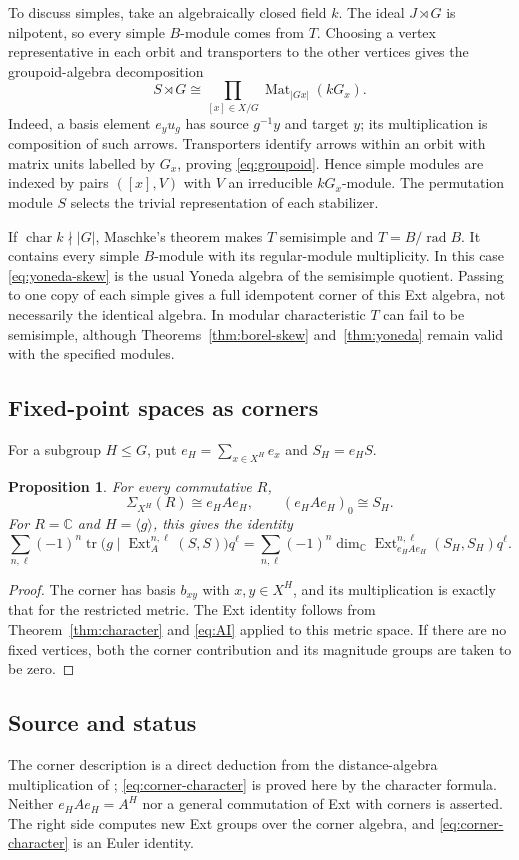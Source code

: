 \documentclass[11pt,a4paper]{article}
\numberwithin{equation}{section}
\newtheorem{proposition}[theorem]{Proposition}
\theoremstyle{definition}
\theoremstyle{remark}
\newcommand{\C}{\mathbb C}
\newcommand{\G}{G}
\newcommand{\Ext}{\operatorname{Ext}}
\newcommand{\tr}{\operatorname{tr}}
\newcommand{\rad}{\operatorname{rad}}
\newcommand{\source}{\subsection*{\color{darkblue}Source and status}}
\begin{document}
To discuss simples, take an algebraically closed field $k$.
The ideal $J\rtimes\G$ is nilpotent, so every simple $B$-module
comes from $T$.  Choosing a vertex representative in each orbit and
transporters to the other vertices gives the groupoid-algebra
decomposition
\begin{equation}\label{eq:groupoid}
 S\rtimes\G\cong
 \prod_{[x]\in X/\G}\operatorname{Mat}_{|\G x|}(k\G_x).
\end{equation}
Indeed, a basis element $e_yu_g$ has source $g^{-1}y$ and target $y$;
its multiplication is composition of such arrows.  Transporters
identify arrows within an orbit with matrix units labelled by
$\G_x$, proving \eqref{eq:groupoid}.  Hence simple modules are indexed
by pairs $([x],V)$ with $V$ an irreducible $k\G_x$-module.  The
permutation module $S$ selects the trivial representation of each
stabilizer.

If $\operatorname{char}k\nmid|\G|$, Maschke's theorem makes $T$
semisimple and $T=B/\rad B$.  It contains every simple $B$-module
with its regular-module multiplicity.  In this case
\eqref{eq:yoneda-skew} is the usual Yoneda algebra of the semisimple
quotient.  Passing to one copy of each simple gives a full idempotent
corner of this Ext algebra, not necessarily the identical algebra.
In modular characteristic $T$ can fail to be semisimple, although
Theorems~\ref{thm:borel-skew} and~\ref{thm:yoneda} remain valid with
the specified modules.

\subsection{Fixed-point spaces as corners}

For a subgroup $H\leq\G$, put
$e_H=\sum_{x\in X^H}e_x$ and $S_H=e_HS$.
\begin{proposition}\label{prop:fixed-corner}
For every commutative $R$,
\[
 \Sigma_{X^H}(R)\cong e_HAe_H,
 \qquad (e_HAe_H)_0\cong S_H.
\]
For $R=\C$ and $H=\langle g\rangle$, this gives the identity
\begin{equation}\label{eq:corner-character}
 \sum_{n,\ell}(-1)^n\tr\bigl(g\mid\Ext_A^{n,\ell}(S,S)\bigr)q^\ell
 =\sum_{n,\ell}(-1)^n
   \dim_\C\Ext_{e_HAe_H}^{n,\ell}(S_H,S_H)q^\ell.
\end{equation}
\end{proposition}
\begin{proof}
The corner has basis $b_{xy}$ with $x,y\in X^H$, and its multiplication
is exactly that for the restricted metric.  The Ext identity follows
from Theorem~\ref{thm:character} and \eqref{eq:AI} applied to this
metric space.  If there are no fixed vertices, both the corner
contribution and its magnitude groups are taken to be zero.
\end{proof}
\source The corner description is a direct deduction from the
distance-algebra multiplication of \cite[\S5.1]{AI};
\eqref{eq:corner-character} is proved here by the character formula.
Neither $e_HAe_H=A^H$ nor a general commutation of Ext with corners
is asserted.  The right side computes new Ext groups over the corner
algebra, and \eqref{eq:corner-character} is an Euler identity.
\end{document}
